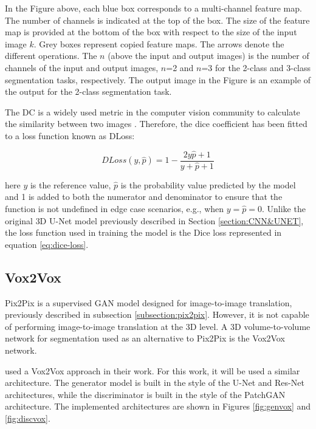In the Figure above, each blue box corresponds to a multi-channel feature map. The number of channels is indicated at the top of the box. The size of the feature map is provided at the bottom of the box with respect to the size of the input image $k$. Grey boxes represent copied feature maps. The arrows denote the different operations. The $n$ (above the input and output images) is the number of channels of the input and output images, $n$=2 and $n$=3 for the 2-class and 3-class segmentation tasks, respectively. The output image in the Figure is an example of the output for the 2-class segmentation task.

The \ac{DC} is a widely used metric in the computer vision community to calculate the similarity between two images \cite{diceloss}. Therefore, the dice coefficient has been fitted to a loss function known as \ac{DLoss}:

\begin{equation}
    DLoss(y,\hat{p}) = 1 - \frac{2y\hat{p}+1}{y+\hat{p}+1}
    \label{eq:dice-loss}
\end{equation}

\noindent here $y$ is the reference value, $\hat{p}$ is the probability value predicted by the model and 1 is added to both the numerator and denominator to ensure that the function is not undefined in edge case scenarios, e.g., when $y=\hat{p}=0$. Unlike the original \ac{3D} U-Net model \cite{Unet:3D} previously described in Section \ref{section:CNN&UNET}, the loss function used in training the model is the Dice loss represented in equation \ref{eq:dice-loss}.

\subsection{Vox2Vox}

Pix2Pix is a supervised GAN model designed for image-to-image translation, previously described in subsection \ref{subsection:pix2pix}. However, it is not capable of performing image-to-image translation at the \ac{3D} level. A \ac{3D} volume-to-volume network for segmentation used as an alternative to Pix2Pix is the Vox2Vox network.

\citet{vox2vox} used a Vox2Vox approach in their work. For this work, it will be used a similar architecture. The generator model is built in the style of the U-Net and Res-Net \cite{2015deep} architectures, while the discriminator is built in the style of the PatchGAN \cite{isola2018imagetoimage}  architecture. The implemented architectures are shown in Figures \ref{fig:genvox} and \ref{fig:discvox}.

